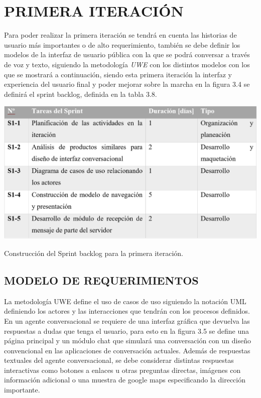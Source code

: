 \documentclass[letter, openright, 12pt]{book}
\begin{document}
\section{PRIMERA ITERACIÓN}

Para poder realizar la primera iteración se tendrá en cuenta las historias de usuario más importantes o de alto requerimiento, también se debe definir los modelos de la interfaz de usuario pública con la que se podrá conversar a través de voz y texto, siguiendo la metodología {\it UWE} con los distintos modelos con los que se mostrará a continuación, siendo esta primera iteración la interfaz y experiencia del usuario final y poder mejorar sobre la marcha en la figura 3.4 se definirá el sprint backlog, definida en la tabla 3.8.

\begin{table}[ht]
\includegraphics[width=1.1\textwidth]{tabla3_8}
\caption{Construcción del Sprint backlog para la primera iteración. } 
\label{tab:tabla3_8} 
\end{table}

\subsection{MODELO DE REQUERIMIENTOS}
La metodología UWE define el uso de casos de uso siguiendo la notación UML definiendo los actores y las interacciones que tendrán con los procesos definidos. En un agente conversacional se requiere de una interfaz gráfica que devuelva las respuestas a dudas que tenga el usuario, para esto en la figura 3.5 se define una página principal y un módulo chat que simulará una conversación con un diseño convencional en las aplicaciones de conversación actuales. 
Además de respuestas textuales del agente conversacional, se debe considerar distintas respuestas interactivas como botones a enlaces u otras preguntas directas, imágenes con información adicional o una muestra de google maps especificando la dirección importante. 
\end{document}

